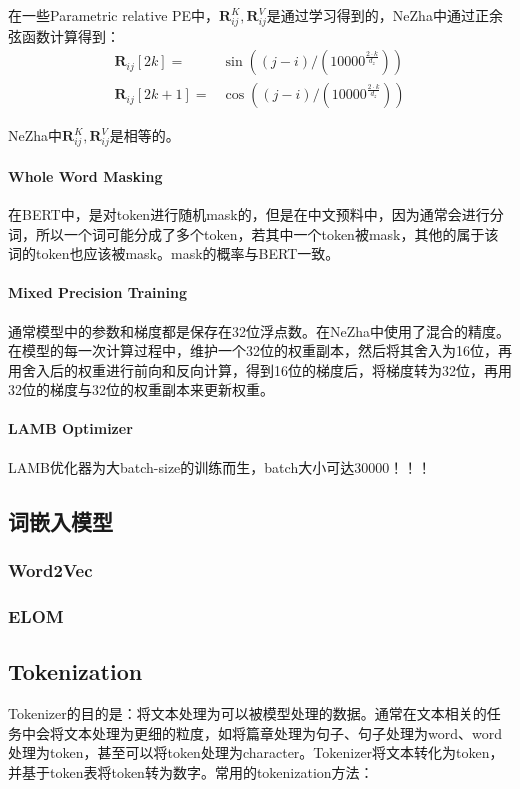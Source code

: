 在一些Parametric relative PE中，$\boldsymbol{R}_{ij}^K, \boldsymbol{R}_{ij}^V$是通过学习得到的，NeZha中通过正余弦函数计算得到：
$$
\begin{equation}
	\begin{aligned}
		\boldsymbol{R}_{ij}[2 k] =& \sin \left((j-i) /\left(10000^{\frac{2 \cdot k}{d_{z}}}\right)\right) \\
		\boldsymbol{R}_{ij}[2 k+1] =& \cos \left((j-i) /\left(10000^{\frac{2 \cdot k}{d_{z}}}\right)\right)
	\end{aligned}
\end{equation}
$$

NeZha中$\boldsymbol{R}_{ij}^K, \boldsymbol{R}_{ij}^V$是相等的。

\paragraph{Whole Word Masking}
在BERT中，是对token进行随机mask的，但是在中文预料中，因为通常会进行分词，所以一个词可能分成了多个token，若其中一个token被mask，其他的属于该词的token也应该被mask。mask的概率与BERT一致。

\paragraph{Mixed Precision Training}
通常模型中的参数和梯度都是保存在32位浮点数。在NeZha中使用了混合的精度。在模型的每一次计算过程中，维护一个32位的权重副本，然后将其舍入为16位，再用舍入后的权重进行前向和反向计算，得到16位的梯度后，将梯度转为32位，再用32位的梯度与32位的权重副本来更新权重。

\paragraph{LAMB Optimizer}
LAMB优化器为大batch-size的训练而生，batch大小可达30000！！！


\subsection{词嵌入模型}
\subsubsection{Word2Vec}

\subsubsection{ELOM}

\subsection{Tokenization}
Tokenizer的目的是：将文本处理为可以被模型处理的数据。通常在文本相关的任务中会将文本处理为更细的粒度，如将篇章处理为句子、句子处理为word、word处理为token，甚至可以将token处理为character。Tokenizer将文本转化为token，并基于token表将token转为数字。常用的tokenization方法：
